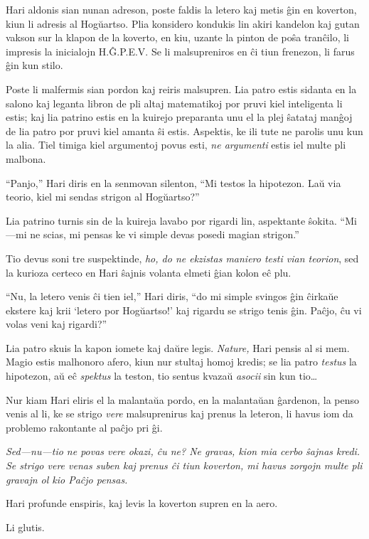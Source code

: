 Hari aldonis sian nunan adreson, poste faldis la letero kaj metis ĝin en koverton, kiun li adresis al Hogŭartso.
Plia konsidero kondukis lin akiri kandelon kaj gutan vakson sur la klapon de la koverto, en kiu, uzante la pinton de poŝa tranĉilo, li impresis la inicialojn H.Ĝ.P.E.V\@.
Se li malsupreniros en ĉi tiun frenezon, li farus ĝin kun stilo.

Poste li malfermis sian pordon kaj reiris malsupren.
Lia patro estis sidanta en la salono kaj leganta libron de pli altaj matematikoj por pruvi kiel inteligenta li estis; kaj lia patrino estis en la kuirejo preparanta unu el la plej ŝatataj manĝoj de lia patro por pruvi kiel amanta ŝi estis.
Aspektis, ke ili tute ne parolis unu kun la alia.
Tiel timiga kiel argumentoj povus esti, \emph{ne argumenti} estis iel multe pli malbona.

“Panjo,” Hari diris en la senmovan silenton, “Mi testos la hipotezon.
Laŭ via teorio, kiel mi sendas strigon al Hogŭartso?”

Lia patrino turnis sin de la kuireja lavabo por rigardi lin, aspektante ŝokita.
“Mi—mi ne scias, mi pensas ke vi simple devas posedi magian strigon.”

Tio devus soni tre suspektinde, \emph{ho, do ne ekzistas maniero testi vian teorion}, sed la kurioza certeco en Hari ŝajnis volanta elmeti ĝian kolon eĉ plu.

“Nu, la letero venis ĉi tien iel,” Hari diris, “do mi simple svingos ĝin ĉirkaŭe ekstere kaj krii ‘letero por Hogŭartso!’ kaj rigardu se strigo tenis ĝin.
Paĉjo, ĉu vi volas veni kaj rigardi?”

Lia patro skuis la kapon iomete kaj daŭre legis.
\emph{Nature,} Hari pensis al si mem.
Magio estis malhonoro afero, kiun nur stultaj homoj kredis; se lia patro \emph{testus} la hipotezon, aŭ eĉ \emph{spektus} la teston, tio sentus kvazaŭ \emph{asocii} sin kun tio…

Nur kiam Hari eliris el la malantaŭa pordo, en la malantaŭan ĝardenon, la penso venis al li, ke se strigo \emph{vere} malsuprenirus kaj prenus la leteron, li havus iom da problemo rakontante al paĉjo pri ĝi.

\emph{Sed—nu—tio ne povas \emph{vere} okazi, ĉu ne?
Ne gravas, kion mia cerbo ŝajnas kredi.
Se strigo vere venas suben kaj prenus ĉi tiun koverton, mi havus zorgojn multe pli gravajn ol kio Paĉjo pensas.}

Hari profunde enspiris, kaj levis la koverton supren en la aero.

Li glutis.


